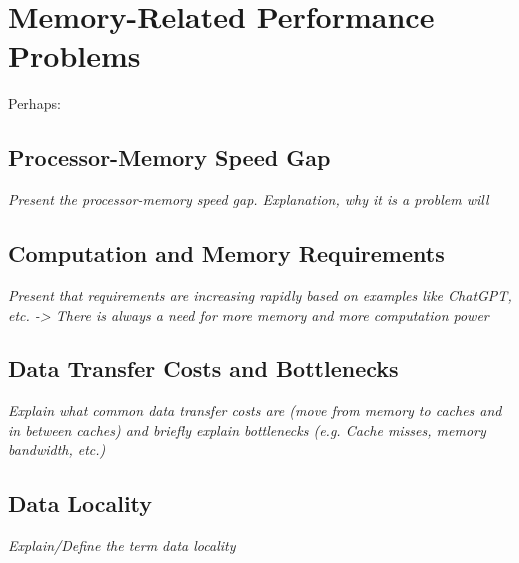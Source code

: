 \section{Memory-Related Performance Problems}\label{sec:background}
Perhaps: \cite{tate2014programming,unat2017trends}

\subsection{Processor-Memory Speed Gap}\label{sec:pmgap}
\textit{Present the processor-memory speed gap. Explanation, why it is a problem will }

\subsection{Computation and Memory Requirements}\label{sec:comp_mem_req}
\textit{Present that requirements are increasing rapidly based on examples like ChatGPT, etc. -> There is always a need for more memory and more computation power}

\subsection{Data Transfer Costs and Bottlenecks}\label{sec:data_transfer}
\textit{Explain what common data transfer costs are (move from memory to caches and in between caches) and briefly explain bottlenecks (e.g. Cache misses, memory bandwidth, etc.)}

\subsection{Data Locality}\label{sec:data_locality}
\textit{Explain/Define the term data locality}
